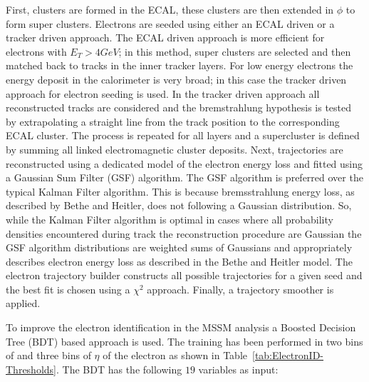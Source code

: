 First, clusters are formed in the ECAL, these clusters are then 
extended in $\phi$ to form super clusters.
Electrons are seeded using either an ECAL driven or a tracker driven approach.
The ECAL driven approach is more efficient for electrons with $E_{T}>4 GeV$;
in this method, super clusters are selected and then matched back to 
tracks in the inner tracker layers. 
For low energy electrons the energy deposit in the calorimeter
is very broad; in this case the tracker driven approach for electron seeding is used.
In the tracker driven approach all reconstructed tracks are considered
and the bremstrahlung hypothesis is tested
by extrapolating a straight line from the track position to the
corresponding ECAL cluster. The process is 
repeated for all layers and a supercluster is defined
by summing all linked electromagnetic cluster deposits. 
Next, trajectories are reconstructed using a dedicated
model of the electron energy loss and fitted using a Gaussian Sum Filter (GSF) algorithm. %
The GSF algorithm is preferred over the typical Kalman Filter algorithm.
This is because bremsstrahlung energy loss, %
as described by Bethe and Heitler, 
does not following a Gaussian distribution. 
So, while the Kalman Filter algorithm is optimal in cases where all probability
densities encountered during track the reconstruction procedure are Gaussian
the GSF algorithm distributions are weighted sums of Gaussians and
appropriately describes electron energy loss as described in the Bethe and Heitler model.
The electron trajectory builder constructs all possible trajectories
for a given seed and the best fit is chosen using a $\chi^{2}$ approach.
Finally, a trajectory smoother is applied.

To improve the electron identification in the MSSM analysis a Boosted Decision Tree (BDT) based %
approach is used. The training has been performed in two
bins of \pt and three bins of $\eta$ of the electron as shown in Table~\ref{tab:ElectronID-Thresholds}\@.
The BDT has the following $19$ variables as input:


